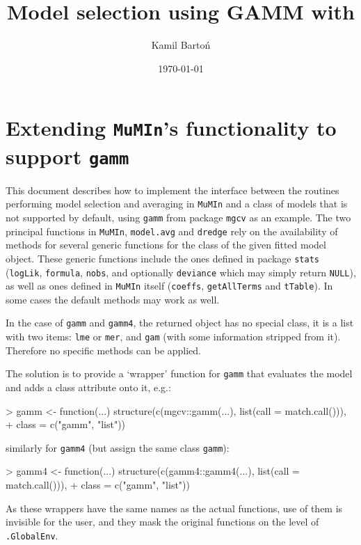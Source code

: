 \documentclass{article}
\title{Model selection using GAMM with \pkg{MuMIn} }
\date{\today}
\author{Kamil Bartoń}
\newcommand{\code}[1]{{\tt #1}}
\newcommand{\pkg}[1]{{\tt #1}}
\newcommand{\sQuote}[1]{{`#1'}}
\begin{document}
\maketitle


\section{Extending \pkg{MuMIn}'s functionality to support \code{gamm} }

This document describes how to implement the interface between the routines
performing model selection and averaging in \pkg{MuMIn} and a class of models
that is not supported by default, using \code{gamm} from package \pkg{mgcv} as
an example.
The two principal functions in \pkg{MuMIn}, \code{model.avg} and \code{dredge}
rely on the availability of methods for several generic functions for the class
of the given fitted model object.
These generic functions include the ones defined in package \code{stats}
(\code{logLik}, \code{formula}, \code{nobs},
and optionally \code{deviance} which may simply return \code{NULL}), as well
as ones defined in \pkg{MuMIn} itself (\code{coeffs},
\code{getAllTerms} and \code{tTable}). In some cases the default methods may
work as well.

In the case of \code{gamm} and \code{gamm4}, the returned object has no special
class, it is a list with two items: \code{lme} or \code{mer}, and \code{gam}
(with some information stripped from it). Therefore no specific methods can be
applied.

The solution is to provide a \sQuote{wrapper} function for \code{gamm} that evaluates
the model and adds a class attribute onto it, e.g.:
\begin{Schunk}
\begin{Sinput}
> gamm <- function(...) structure(c(mgcv::gamm(...), list(call = match.call())), 
+     class = c("gamm", "list"))
\end{Sinput}
\end{Schunk}
similarly for \code{gamm4} (but assign the same class \code{gamm}):
\begin{Schunk}
\begin{Sinput}
> gamm4 <- function(...) structure(c(gamm4::gamm4(...), list(call = match.call())), 
+     class = c("gamm", "list"))
\end{Sinput}
\end{Schunk}

As these wrappers have the same names as the actual functions, use of them is
invisible for the user, and they mask the original functions on the level of
\code{.GlobalEnv}.
\end{document}
